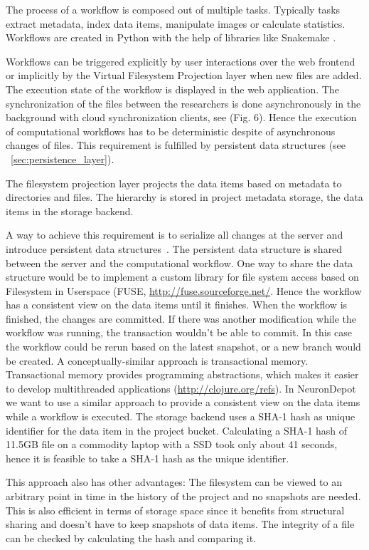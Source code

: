 \documentclass{frontiersSCNS} %
\begin{document}
The process of a workflow is composed out of multiple tasks. Typically
tasks extract metadata, index data items, manipulate images or calculate
statistics. Workflows are created in Python with the help of libraries like
Snakemake \citep{Koester2012}.

Workflows can be triggered explicitly by user interactions over the web
frontend or implicitly by the Virtual Filesystem Projection layer when new
files are added. The execution state of the workflow is displayed in the web
application. The synchronization of the files between the researchers is done
asynchronously in the background with cloud synchronization clients, see (Fig.
6). Hence the execution of computational workflows  has to be deterministic
despite of asynchronous changes of files. This requirement is fulfilled by
persistent data structures (see ~\ref{sec:persistence_layer}).

The filesystem projection layer projects the data items based on metadata to
directories and files. The hierarchy is stored in project metadata storage, the
data items in the storage backend.

A way to achieve this requirement is to serialize all changes at the server and
introduce persistent data structures~\cite{Driscoll1989}. The persistent data
structure is shared between the server and the computational workflow. One way
to share the data structure would be to implement a custom library for file
system access based on Filesystem in Userspace (FUSE, \url{http://fuse.sourceforge.net/}. Hence the workflow has a consistent view on the
data items until it finishes. When the workflow is finished, the changes are
committed. If there was another modification while the workflow was running,
the transaction wouldn’t be able to commit. In this case the workflow could be
rerun based on the latest snapshot, or a new branch would be created. A
conceptually-similar approach is transactional memory. Transactional memory
provides programming abstractions, which makes it easier to develop
multithreaded applications (\url{http://clojure.org/refs}). In NeuronDepot we
want to use a similar approach to provide a consistent view on the data items
while a workflow is executed. The storage backend uses a SHA-1 hash as unique
identifier for the data item in the project bucket. Calculating a SHA-1 hash of
11.5GB file on a commodity laptop with a SSD took only about 41 seconds, hence
it is feasible to take a SHA-1 hash as the unique identifier.

This approach also has other advantages: The filesystem can be viewed to an
arbitrary point in time in the history of the project and no snapshots are
needed. This is also efficient in terms of storage space since it benefits from
structural sharing and doesn't have to keep snapshots of data items. The
integrity of a file can be checked by calculating the hash and comparing it.
\end{document}
